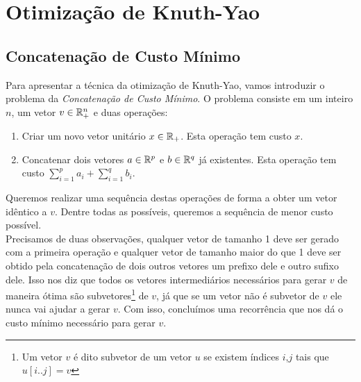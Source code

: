 \section{Otimização de Knuth-Yao}
\label{Knuth-Yao}




\subsection{Concatenação de Custo Mínimo}

Para apresentar a técnica da otimização de Knuth-Yao, vamos introduzir o problema da \textit{Concatenação de Custo Mínimo}. O problema consiste em um inteiro $n$, um vetor $v \in \mathbb{R}^n_+$ e duas operações:

\begin{enumerate}
\item Criar um novo vetor unitário $x \in \mathbb{R}_+$. Esta operação tem custo $x$.
\item Concatenar dois vetores $a \in \mathbb{R}^p$ e $b \in \mathbb{R}^q$ já existentes. Esta operação tem custo $\sum \limits_{i=1}^p a_i + \sum \limits_{i=1}^q b_i$.
\end{enumerate}

Queremos realizar uma sequência destas operações de forma a obter um vetor idêntico a $v$. Dentre todas as possíveis, queremos a sequência de menor custo possível. \\

Precisamos de duas observações, qualquer vetor de tamanho 1 deve ser gerado com a primeira operação e qualquer vetor de tamanho maior do que 1 deve ser obtido pela concatenação de dois outros vetores um prefixo dele e outro sufixo dele. Isso nos diz que todos os vetores intermediários necessários para gerar $v$ de maneira ótima são subvetores\footnote{Um vetor $v$ é dito subvetor de um vetor $u$ se existem índices $i$,$j$ tais que $u[i..j] = v$} de $v$, já que se um vetor não é subvetor de $v$ ele nunca vai ajudar a gerar $v$. Com isso, concluímos uma recorrência que nos dá o custo mínimo necessário para gerar $v$. 


